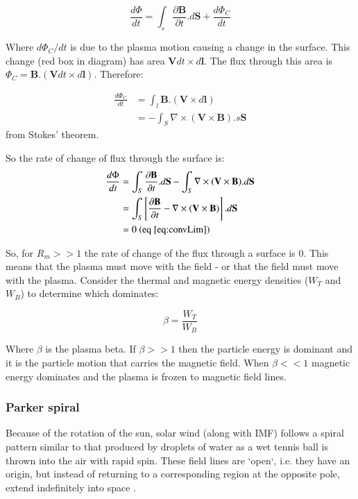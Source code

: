 \documentclass[12pt]{article}
\begin{document}
\begin{equation}
    \frac{d\Phi}{dt} = \int_s\frac{\partial\textbf{B}}{\partial t}.d\textbf{S} + \frac{d\Phi_C}{dt}
\end{equation}

Where $d\Phi_C/dt$ is due to the plasma motion causing a change in the surface.
This change (red box in diagram) has area $\textbf{V}dt\times d\textbf{l}$. The flux through this area is $\Phi_C=\textbf{B}.(\textbf{V}dt\times d\textbf{l})$. Therefore:

\begin{align}
    \frac{d\Phi_C}{dt}&=\int_l\textbf{B}.(\textbf{V}\times d\textbf{l}) \nonumber\\
    &=-\int_S\nabla\times(\textbf{V}\times\textbf{B}).s\textbf{S}
\end{align}
from Stokes' theorem.

So the rate of change of flux through the surface is:
\begin{align}
    \frac{d\Phi}{dt}&=\int_S\frac{\partial\textbf{B}}{\partial t}.d\textbf{S}-\int_S\nabla\times(\textbf{V}\times\textbf{B}).d\textbf{S} \nonumber\\
    &= \int_S\left[\frac{\partial\textbf{B}}{\partial t}-\nabla\times(\textbf{V}\times\textbf{B})\right].d\textbf{S} \nonumber\\
    &= 0\text{ (eq \ref{eq:convLim})}
\end{align}

So, for $R_m >> 1$ the rate of change of the flux through a surface is 0. This means that the plasma must move with the field - or that the field must move with the plasma. Consider the thermal and magnetic energy densities ($W_T$ and $W_B$) to determine which dominates:

\begin{equation}
    \beta=\frac{W_T}{W_B}
\end{equation}

Where $\beta$ is the plasma beta. If $\beta>>1$ then the particle energy is dominant and it is the particle motion that carries the magnetic field. When $\beta<<1$ magnetic energy dominates and the plasma is frozen to magnetic field lines.

\subsubsection{Parker spiral}

Because of the rotation of the sun, solar wind (along with IMF) follows a spiral pattern similar to that produced by droplets of water as a wet tennis ball is thrown into the air with rapid spin. These field lines are `open`, i.e. they have an origin, but instead of returning to a corresponding region at the opposite pole, extend indefinitely into space \cite{imfUptoLat16}. 
\end{document}
